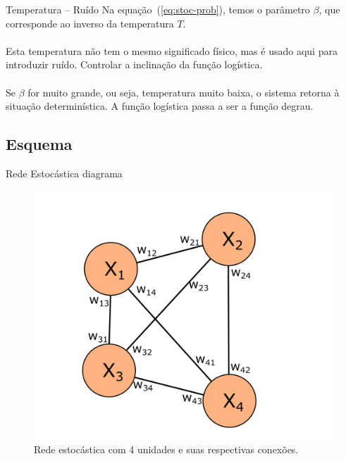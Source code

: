 \begin{frame}{Temperatura -- Ruído}%
  \justifying%
  Na equação~(\ref{eq:stoc-prob}), temos o parâmetro $\beta$, que corresponde ao inverso da temperatura $T$.
  \\~\\
  Esta temperatura não tem o mesmo significado físico, mas é usado aqui para introduzir ruído. Controlar a inclinação da função logística.
  \\~\\
  Se $\beta$ for muito grande, ou seja, temperatura muito baixa, o sistema retorna à situação determinística. A função logística passa a ser a função degrau.
\end{frame}

\subsection{Esquema}
\begin{frame}{Rede Estocástica diagrama}%
  \begin{figure}%
    \label{fig:stoc-diagram}%
    \includegraphics[scale=0.5]{images/stochastic_full.png}
    \caption{Rede estocástica com 4 unidades e suas respectivas conexões.}
  \end{figure}
\end{frame}

